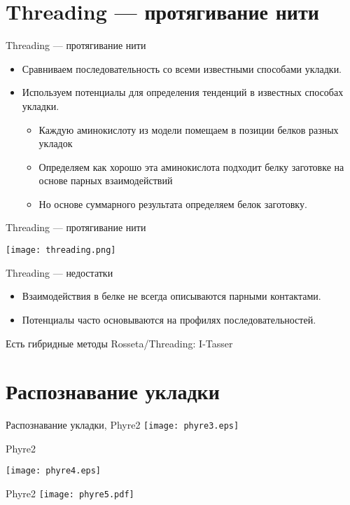 \section{Threading — протягивание нити}

\begin{frame}
{Threading — протягивание нити}
	\begin{itemize}
		\item
			 Сравниваем последовательность со всеми известными способами укладки.
		 \item
			 Используем потенциалы для определения тенденций в известных  способах укладки.
			 \begin{itemize}
				 \item
			 Каждую аминокислоту из модели помещаем в позиции белков разных укладок
		 \item
			 Определяем как хорошо эта аминокислота подходит белку заготовке на основе парных взаимодействий
		 \item
			 Но основе суммарного результата определяем белок заготовку.
			 \end{itemize}
	\end{itemize}
\end{frame}
\begin{frame}
{Threading — протягивание нити}
	\begin{center}
		\texttt{[image: threading.png]}  
	\end{center}
\end{frame}
\begin{frame}
{Threading — недостатки}
	\begin{itemize}
		\item
			 Взаимодействия в белке не всегда описываются парными контактами.
		 \item
			 Потенциалы часто основываются на профилях последовательностей.
	\end{itemize}
	\vspace{1.0cm}
	Есть гибридные методы Rosseta/Threading: I-Tasser
\end{frame}
\section{Распознавание укладки}

\begin{frame}
{Распознавание укладки, Phyre2}
\centering
		\texttt{[image: phyre3.eps]}  
\end{frame}
\begin{frame}
{Phyre2}
\centering

		\texttt{[image: phyre4.eps]}  
\end{frame}
\begin{frame}
{Phyre2}
\centering
		\texttt{[image: phyre5.pdf]}  
\end{frame}

